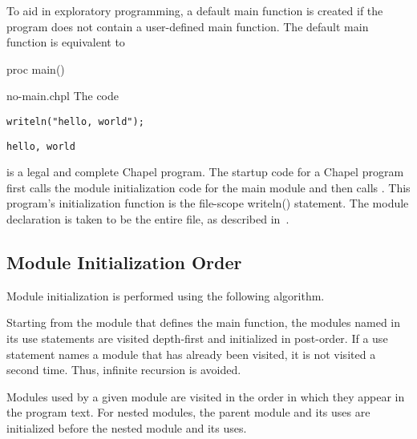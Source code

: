 To aid in exploratory programming, a default main function is
created if the program does not contain a user-defined main function.  The
default main function is equivalent to
\begin{chapel}
proc main() {}
\end{chapel}

\begin{chapelexample}{no-main.chpl}
The code
\begin{chapel}
\begin{verbatim}
writeln("hello, world");

\end{verbatim}
\end{chapel}
\begin{chapeloutput}
\begin{verbatim}
hello, world
\end{verbatim}
\end{chapeloutput}
is a legal and complete Chapel program.  The startup code for a Chapel program
first calls the module initialization code for the main module and then
calls .  This program's initialization function is the file-scope
writeln() statement.  The module declaration is taken to be the entire file,
as described in~.
\end{chapelexample}


\subsection{Module Initialization Order}
\label{Module_Initialization_Order}

Module initialization is performed using the following algorithm.

Starting from the module that defines the main function, the modules named in
its use statements are visited depth-first and initialized in post-order.  If a
use statement names a module that has already been visited, it is not visited a
second time.  Thus, infinite recursion is avoided.

Modules used by a given module are visited in the order in which
they appear in the program text.  For nested modules, the
parent module and its uses are initialized before the nested module and its uses.

